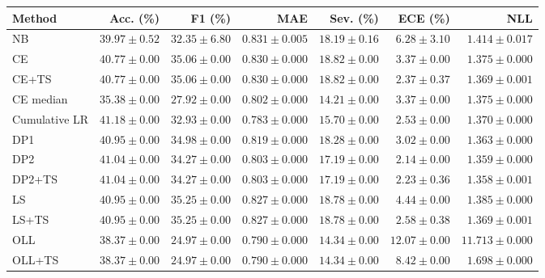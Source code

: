 \begin{tabular}{lrrrrrr}
\toprule
Method & Acc. (\%) & F1 (\%) & MAE & Sev. (\%) & ECE (\%) & NLL \\
\midrule
NB & $39.97\!\pm\!0.52$ & $32.35\!\pm\!6.80$ & $0.831\!\pm\!0.005$ & $18.19\!\pm\!0.16$ & $6.28\!\pm\!3.10$ & $1.414\!\pm\!0.017$ \\
CE & $40.77\!\pm\!0.00$ & $35.06\!\pm\!0.00$ & $0.830\!\pm\!0.000$ & $18.82\!\pm\!0.00$ & $3.37\!\pm\!0.00$ & $1.375\!\pm\!0.000$ \\
CE+TS & $40.77\!\pm\!0.00$ & $35.06\!\pm\!0.00$ & $0.830\!\pm\!0.000$ & $18.82\!\pm\!0.00$ & $2.37\!\pm\!0.37$ & $1.369\!\pm\!0.001$ \\
CE median & $35.38\!\pm\!0.00$ & $27.92\!\pm\!0.00$ & $0.802\!\pm\!0.000$ & $14.21\!\pm\!0.00$ & $3.37\!\pm\!0.00$ & $1.375\!\pm\!0.000$ \\
Cumulative LR & $41.18\!\pm\!0.00$ & $32.93\!\pm\!0.00$ & $0.783\!\pm\!0.000$ & $15.70\!\pm\!0.00$ & $2.53\!\pm\!0.00$ & $1.370\!\pm\!0.000$ \\
DP1 & $40.95\!\pm\!0.00$ & $34.98\!\pm\!0.00$ & $0.819\!\pm\!0.000$ & $18.28\!\pm\!0.00$ & $3.02\!\pm\!0.00$ & $1.363\!\pm\!0.000$ \\
DP2 & $41.04\!\pm\!0.00$ & $34.27\!\pm\!0.00$ & $0.803\!\pm\!0.000$ & $17.19\!\pm\!0.00$ & $2.14\!\pm\!0.00$ & $1.359\!\pm\!0.000$ \\
DP2+TS & $41.04\!\pm\!0.00$ & $34.27\!\pm\!0.00$ & $0.803\!\pm\!0.000$ & $17.19\!\pm\!0.00$ & $2.23\!\pm\!0.36$ & $1.358\!\pm\!0.001$ \\
LS & $40.95\!\pm\!0.00$ & $35.25\!\pm\!0.00$ & $0.827\!\pm\!0.000$ & $18.78\!\pm\!0.00$ & $4.44\!\pm\!0.00$ & $1.385\!\pm\!0.000$ \\
LS+TS & $40.95\!\pm\!0.00$ & $35.25\!\pm\!0.00$ & $0.827\!\pm\!0.000$ & $18.78\!\pm\!0.00$ & $2.58\!\pm\!0.38$ & $1.369\!\pm\!0.001$ \\
OLL & $38.37\!\pm\!0.00$ & $24.97\!\pm\!0.00$ & $0.790\!\pm\!0.000$ & $14.34\!\pm\!0.00$ & $12.07\!\pm\!0.00$ & $11.713\!\pm\!0.000$ \\
OLL+TS & $38.37\!\pm\!0.00$ & $24.97\!\pm\!0.00$ & $0.790\!\pm\!0.000$ & $14.34\!\pm\!0.00$ & $8.42\!\pm\!0.00$ & $1.698\!\pm\!0.000$ \\
\bottomrule
\end{tabular}